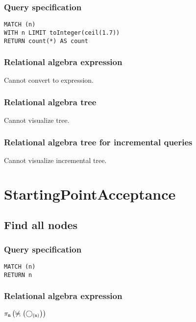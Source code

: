 \subsubsection*{Query specification}

\begin{lstlisting}
MATCH (n)
WITH n LIMIT toInteger(ceil(1.7))
RETURN count(*) AS count
\end{lstlisting}

\subsubsection*{Relational algebra expression}

Cannot convert to expression.

\subsubsection*{Relational algebra tree}

Cannot visualize tree.

\subsubsection*{Relational algebra tree for incremental queries}

Cannot visualize incremental tree.

\section{StartingPointAcceptance}

\subsection{Find all nodes}

\subsubsection*{Query specification}

\begin{lstlisting}
MATCH (n)
RETURN n
\end{lstlisting}

\subsubsection*{Relational algebra expression}

$\projection{\var{n}} \left(\alldifferent{} \left(\getvertices{n}{}\right)\right)$

